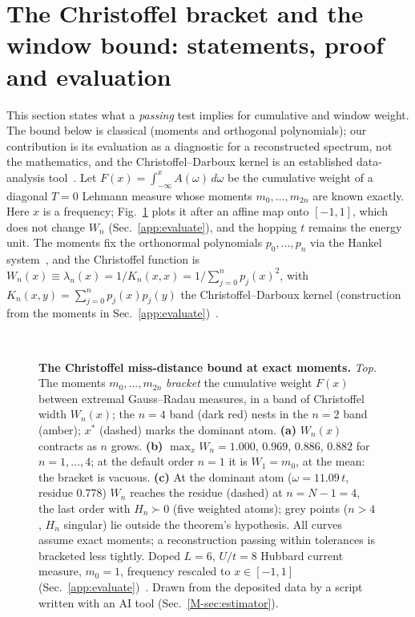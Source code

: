 \documentclass[aps,prb,onecolumn,superscriptaddress,longbibliography,floatfix]{revtex4-2}
\begin{document}
\section{The Christoffel bracket and the window bound: statements, proof and evaluation}
\label{app:proof}
\newtheorem{applemma}{Lemma}\renewcommand{\theapplemma}{S\arabic{applemma}}%
This section states what a \emph{passing} test implies for cumulative and window weight. The bound below is classical (moments and orthogonal polynomials); our contribution is its evaluation as a diagnostic for a reconstructed spectrum, not the mathematics, and the Christoffel--Darboux kernel is an established data-analysis tool~\cite{GM2010,Szego1975,PauwelsLasserre2019,LasserrePauwelsPutinar2022}. Let $F(x)=\int_{-\infty}^{x}A(\omega)\,d\omega$ be the cumulative weight of a diagonal $T=0$ Lehmann measure whose moments $m_0,\dots,m_{2n}$ are known exactly. Here $x$ is a frequency; Fig.~\ref{fig:christoffel} plots it after an affine map onto $[-1,1]$, which does not change $W_n$ (Sec.~\ref{app:evaluate}), and the hopping $t$ remains the energy unit. The moments fix the orthonormal polynomials $p_0,\dots,p_n$ via the Hankel system~\cite{ShohatTamarkin1943}, and the Christoffel function is $W_n(x)\equiv\lambda_n(x)=1/K_n(x,x)=1/\sum_{j=0}^{n}p_j(x)^2$, with $K_n(x,y)=\sum_{j=0}^{n}p_j(x)p_j(y)$ the Christoffel--Darboux kernel (construction from the moments in Sec.~\ref{app:evaluate})~\cite{Szego1975,GM2010}.

\begin{figure}[t]
\centering
{}\\[6pt]
\caption{\textbf{The Christoffel miss-distance bound at exact moments.} \emph{Top.} The moments $m_0,\dots,m_{2n}$ \emph{bracket} the cumulative weight $F(x)$ between extremal Gauss--Radau measures, in a band of Christoffel width $W_n(x)$; the $n{=}4$ band (dark red) nests in the $n{=}2$ band (amber); $x^{*}$ (dashed) marks the dominant atom. \textbf{(a)} $W_n(x)$ contracts as $n$ grows. \textbf{(b)} $\max_xW_n=1.000$, $0.969$, $0.886$, $0.882$ for $n=1,\dots,4$; at the default order $n=1$ it is $W_1=m_0$, at the mean: the bracket is vacuous. \textbf{(c)} At the dominant atom ($\omega=11.09\,t$, residue $0.778$) $W_n$ reaches the residue (dashed) at $n=N-1=4$, the last order with $H_n\succ0$ (five weighted atoms); grey points ($n>4$, $H_n$ singular) lie outside the theorem's hypothesis. All curves assume exact moments; a reconstruction passing within tolerances is bracketed less tightly. Doped $L=6$, $U/t=8$ Hubbard current measure, $m_0=1$, frequency rescaled to $x\in[-1,1]$ (Sec.~\ref{app:evaluate})~\cite{GM2010,ShohatTamarkin1943,Akhiezer1965,Totik2000,MNT1991,Szego1975}. Drawn from the deposited data by a script written with an AI tool (Sec.~\ref{M-sec:estimator}).}
\label{fig:bracketing}
\label{fig:christoffel}
\end{figure}
\end{document}
